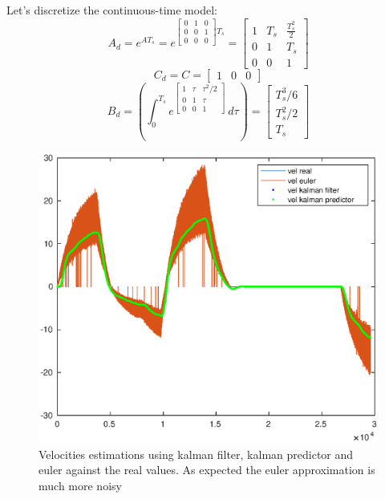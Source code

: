 \documentclass[a4paper,12pt]{article}
\begin{document}
\noindent Let's discretize the continuous-time model:
\[
    A_d = e^{AT_s} = e^{\begin{bmatrix}  0&1&0 \\ 0&0&1\\0&0&0 \end{bmatrix}T_s} = \begin{bmatrix} 1&T_s&\frac{T_s^2}{2}\\0&1&T_s\\0&0&1 \end{bmatrix}
\]
\[
    C_d = C = \begin{bmatrix} 1&0&0 \end{bmatrix}
\]
\[
    B_d = \left (\int_{0}^{T_s} e^{\begin{bmatrix} 1&\tau&\tau^2/2\\0&1&\tau\\0&0&1 \end{bmatrix}} \,d\tau \right) = \begin{bmatrix} T_s^3/6\\T_s^2/2\\T_s \end{bmatrix}
\]


\begin{figure}[H]
    \begin{center}
        \includegraphics[scale=1.0]{images/velocities.eps}
    \end{center}
    \caption{Velocities estimations using kalman filter, kalman predictor and euler against the real values. As expected the euler approximation is much more noisy}
    \label{fig:hw3_vel}
\end{figure}
\end{document}
